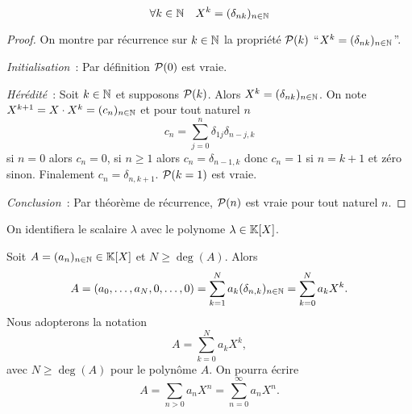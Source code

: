 \begin{lemme}
  \begin{equation}
    \forall k\in \N \quad X^k = (\delta_{nk})_{n \in \N}
  \end{equation}
\end{lemme}
\begin{proof}
  On montre par récurrence sur \(k \in \N\) la propriété \(\P(k)\) ``\(X^k = 
  (\delta_{nk})_{n \in \N}\)''.

  \emph{Initialisation}~: Par définition \(\P(0)\) est vraie.

  \emph{Hérédité}~: Soit \(k \in \N\) et supposons \(\P(k)\). Alors 
  \(X^k=(\delta_{nk})_{n \in \N}\). On note \(X^{k+1}=X \cdot X^k=(c_n)_{n \in 
  \N}\) et pour tout naturel \(n\)
  \begin{equation}
    c_n = \sum_{j=0}^n \delta_{1j} \delta_{n-j,k}
  \end{equation}
  si \(n=0\) alors \(c_n=0\), si \(n \geqslant 1\) alors \(c_n=\delta_{n-1,k}\) 
  donc \(c_n=1\) si \(n=k+1\) et zéro sinon. Finalement \(c_n=\delta_{n,k+1}\). 
  \(\P(k=1)\) est vraie.

  \emph{Conclusion}~: Par théorème de récurrence, \(\P(n)\) est vraie pour tout 
  naturel \(n\).
\end{proof}

On identifiera le scalaire \(\lambda\) avec le polynome \(\lambda \in \K[X]\).

Soit \(A=(a_n)_{n \in \N} \in \K[X]\) et \(N \geqslant \deg(A)\). Alors
\begin{equation}
  A = (a_0, \ldots, a_N, 0, \ldots, 0) = \sum_{k=1}^N a_k (\delta_{n,k})_{n \in 
  \N}=\sum_{k=0}^N a_k X^k.
\end{equation}
Nous adopterons la notation
\begin{equation}
  A = \sum_{k=0}^N a_k X^k,
\end{equation}
avec \(N \geqslant \deg(A)\) pour le polynôme \(A\). On pourra écrire
\begin{equation}
  A = \sum_{n>0} a_n X^n = \sum_{n=0}^{\infty} a_n X^n.
\end{equation}

